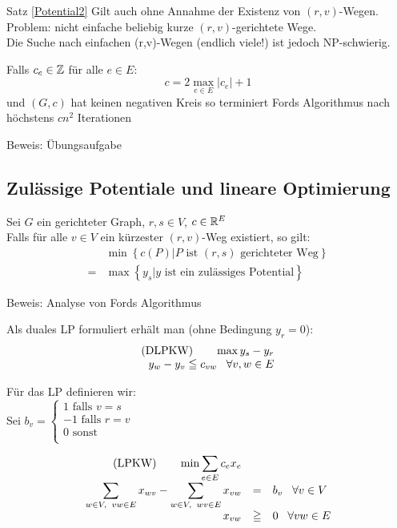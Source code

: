 Satz \ref{Potential2} Gilt auch ohne Annahme der Existenz von
$(r,v)$-Wegen.\\
Problem: nicht einfache beliebig kurze $(r,v)$-gerichtete Wege.\\
Die Suche nach einfachen (r,v)-Wegen (endlich viele!) ist jedoch
NP-schwierig.

\begin{satz}
Falls $c_{e} \in \mathbb{Z}$ für alle $e \in E$:
\[ c = 2 \max_{e \in E} | c_{e} | + 1 \]
und $(G,c)$  hat keinen negativen Kreis so terminiert Fords Algorithmus
nach höchstens $c n^{2}$ Iterationen
\end{satz}
Beweis: Übungsaufgabe

\subsection{Zulässige Potentiale und lineare Optimierung}

\begin{satz} 

Sei $G$ ein gerichteter Graph, $r,s \in V$, $c \in \mathbb{R}^{E}$\\
Falls für alle $v \in V$ ein kürzester  $(r,v)$-Weg existiert, so gilt:\\
\[\begin{array}{cl}
&\min \left\{c(P) | P \mbox{ ist $(r,s)$ gerichteter Weg} \right\}\\
=& \max \left\{ y_{s} | y \mbox{ ist ein zulässiges Potential}\right\}
\end{array}\]
\end{satz}
Beweis: Analyse von Fords Algorithmus

Als duales LP formuliert erhält man (ohne Bedingung $y_{r}=0$):
\[\begin{array}{rcl}
\mbox{(DLPKW)} \hspace{7mm} \max y_{s} -y_{r}\\
y_{w} - y_{v} \leqq c_{v w} \; \; \; \forall v,w \in E
\end{array}\]

Für das LP definieren wir:\\
Sei $b_{v} = \left\{ \begin{array}{l} 1 \mbox{ falls } v =s\\
-1 \mbox{ falls } r =v\\
0 \mbox{ sonst}\\
\end{array} \right.$

\[\begin{array}{rcl}
\mbox{(LPKW)} \hspace{7mm} \min \displaystyle \sum_{e \in E} c_{e} x_{e}\\
\displaystyle \sum_{w \in V, \; \; v w \in E} x_{w v} -  \sum_{w \in V, \;
\; w v \in E} x_{v w} &=& b_{v} \; \; \; \forall v \in V\\
x_{v w} &\geqq & 0  \; \; \; \forall v w \in E
\end{array}\]

